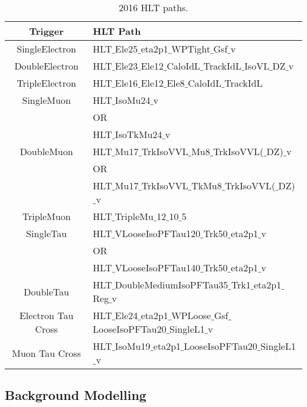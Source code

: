 \begin{table}[h]
    \centering
    \begin{tabular}{|c|l|}
    \hline
    Trigger & HLT Path  \\
    \hline
    SingleElectron & HLT$\_$Ele25$\_$eta2p1$\_$WPTight$\_$Gsf$\_$v\\
    \hline
    DoubleElectron & HLT$\_$Ele23$\_$Ele12$\_$CaloIdL$\_$TrackIdL$\_$IsoVL$\_$DZ$\_$v \\
    \hline
    TripleElectron & HLT$\_$Ele16$\_$Ele12$\_$Ele8$\_$CaloIdL$\_$TrackIdL \\
    \hline
    SingleMuon & HLT$\_$IsoMu24$\_$v \\
    & OR \\
    & HLT$\_$IsoTkMu24$\_$v \\
    \hline
    DoubleMuon & HLT$\_$Mu17$\_$TrkIsoVVL$\_$Mu8$\_$TrkIsoVVL($\_$DZ)$\_$v \\
    & OR \\
    & HLT$\_$Mu17$\_$TrkIsoVVL$\_$TkMu8$\_$TrkIsoVVL($\_$DZ)$\_$v \\
    \hline
    TripleMuon & HLT$\_$TripleMu$\_$12$\_$10$\_$5 \\
    \hline
    SingleTau & HLT$\_$VLooseIsoPFTau120$\_$Trk50$\_$eta2p1$\_$v \\
    & OR \\
    & HLT$\_$VLooseIsoPFTau140$\_$Trk50$\_$eta2p1$\_$v \\
    \hline
    DoubleTau & HLT$\_$DoubleMediumIsoPFTau35$\_$Trk1$\_$eta2p1$\_$Reg$\_$v \\
    \hline
    Electron Tau Cross & HLT$\_$Ele24$\_$eta2p1$\_$WPLoose$\_$Gsf$\_$LooseIsoPFTau20$\_$SingleL1$\_$v \\
    \hline
    Muon Tau Cross & HLT$\_$IsoMu19$\_$eta2p1$\_$LooseIsoPFTau20$\_$SingleL1$\_$v \\
    \hline
    \end{tabular}
    \caption{2016 HLT paths.}
\end{table}


\subsection{Background Modelling}

